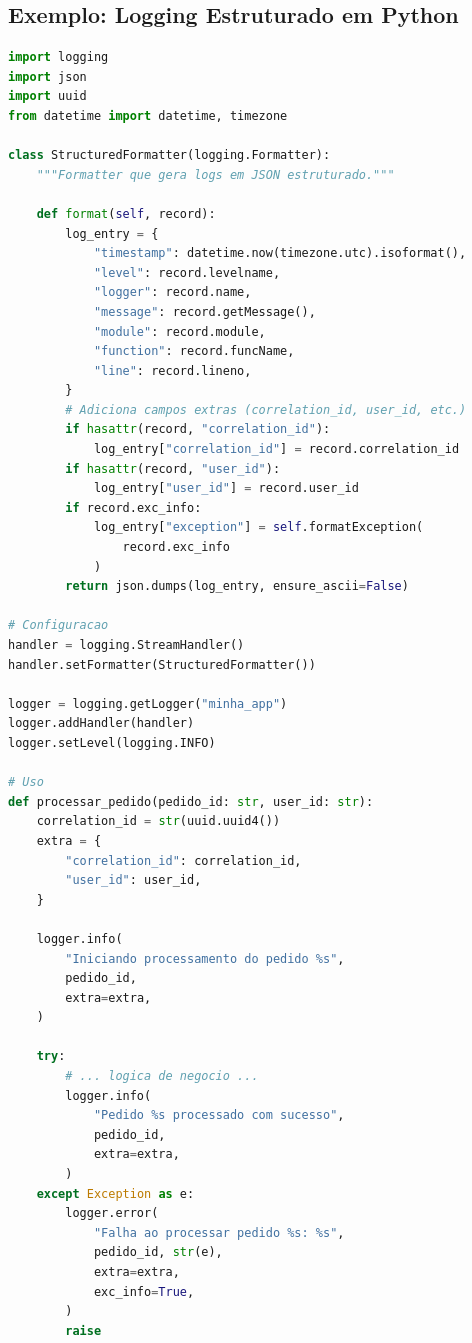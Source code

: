 \subsection{Exemplo: Logging Estruturado em Python}

\begin{lstlisting}[language=Python, caption={Logging Estruturado em Python}]
import logging
import json
import uuid
from datetime import datetime, timezone

class StructuredFormatter(logging.Formatter):
    """Formatter que gera logs em JSON estruturado."""

    def format(self, record):
        log_entry = {
            "timestamp": datetime.now(timezone.utc).isoformat(),
            "level": record.levelname,
            "logger": record.name,
            "message": record.getMessage(),
            "module": record.module,
            "function": record.funcName,
            "line": record.lineno,
        }
        # Adiciona campos extras (correlation_id, user_id, etc.)
        if hasattr(record, "correlation_id"):
            log_entry["correlation_id"] = record.correlation_id
        if hasattr(record, "user_id"):
            log_entry["user_id"] = record.user_id
        if record.exc_info:
            log_entry["exception"] = self.formatException(
                record.exc_info
            )
        return json.dumps(log_entry, ensure_ascii=False)

# Configuracao
handler = logging.StreamHandler()
handler.setFormatter(StructuredFormatter())

logger = logging.getLogger("minha_app")
logger.addHandler(handler)
logger.setLevel(logging.INFO)

# Uso
def processar_pedido(pedido_id: str, user_id: str):
    correlation_id = str(uuid.uuid4())
    extra = {
        "correlation_id": correlation_id,
        "user_id": user_id,
    }

    logger.info(
        "Iniciando processamento do pedido %s",
        pedido_id,
        extra=extra,
    )

    try:
        # ... logica de negocio ...
        logger.info(
            "Pedido %s processado com sucesso",
            pedido_id,
            extra=extra,
        )
    except Exception as e:
        logger.error(
            "Falha ao processar pedido %s: %s",
            pedido_id, str(e),
            extra=extra,
            exc_info=True,
        )
        raise
\end{lstlisting}

